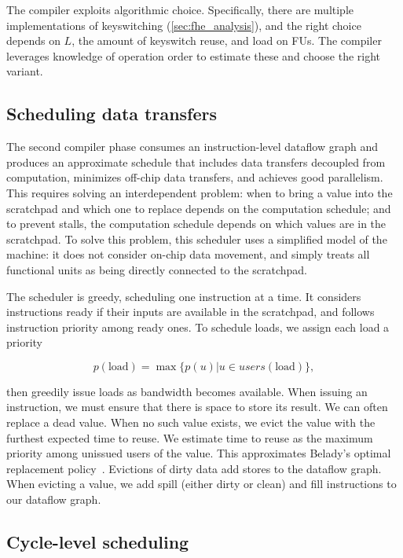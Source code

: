 The compiler exploits algorithmic choice. Specifically, there are multiple
implementations of keyswitching (\autoref{sec:fhe_analysis}), and the right
choice depends on $L$, the amount of keyswitch reuse, and load on FUs. The
compiler leverages knowledge of operation order to estimate these and choose
the right variant.

\subsection{Scheduling data transfers}
\label{sec:datatransfers}

The second compiler phase consumes an instruction-level dataflow graph and
produces an approximate schedule that includes data transfers decoupled from
computation, minimizes off-chip data transfers, and achieves good parallelism.
This requires solving an interdependent problem: when to bring a value into the
scratchpad and which one to replace depends on the computation schedule; and to
prevent stalls, the computation schedule depends on which values are in the
scratchpad. To solve this problem, this scheduler uses a simplified model of
the machine: it does not consider on-chip data movement, and simply treats all
functional units as being directly connected to the scratchpad.

The scheduler is greedy, scheduling one instruction at a time. It considers
instructions ready if their inputs are available in the scratchpad, and follows
instruction priority among ready ones. To schedule loads, we assign each load a
priority

\begin{equation*}
p(\text{load}) = \max \{ p(u) | u \in users(\text{load})\},
\end{equation*}

then greedily issue loads as bandwidth becomes available. When issuing an
instruction, we must ensure that there is space to store its result. We can
often replace a dead value. When no such value exists, we evict the value with
the furthest expected time to reuse. We estimate time to reuse as the maximum
priority among unissued users of the value. This approximates Belady's optimal
replacement policy~\cite{belady1966study}. Evictions of dirty data add stores
to the dataflow graph. When evicting a value, we add spill (either dirty or
clean) and fill instructions to our dataflow graph.

\subsection{Cycle-level scheduling}

